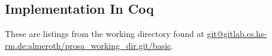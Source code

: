 
\subsection{Implementation In Coq}

These are listings from the working directory found at \url{git@gitlab.cs.hs-rm.de:almeroth/prosa_working_dir.git/basic}.







